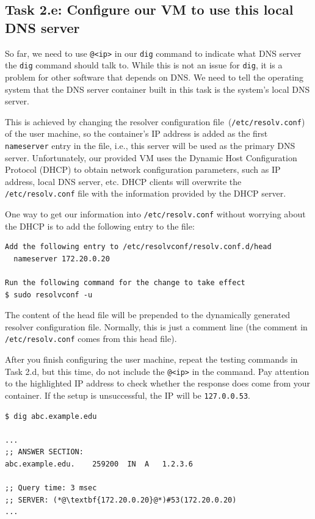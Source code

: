 \subsection{Task 2.e: Configure our VM to use this local DNS server} 

So far, we need to use \texttt{@<ip>} in our \texttt{dig} command
to indicate what DNS server the \texttt{dig} command should talk to. While this 
is not an issue for \texttt{dig}, it is a problem for other software that 
depends on DNS. We need to tell the operating system that the 
DNS server container built in this task is the system's 
local DNS server. 

This is achieved by changing
the resolver configuration file~(\texttt{/etc/resolv.conf}) of the user machine,
so the container's IP address is added as the first \texttt{nameserver} entry in the file, i.e.,
this server will be used as the primary DNS server.
Unfortunately, our provided VM uses the Dynamic Host Configuration Protocol (DHCP) to obtain
network configuration parameters, such as IP address, local DNS server, etc.
DHCP clients will overwrite the \texttt{/etc/resolv.conf} file with the information
provided by the DHCP server.

One way to get our information into \texttt{/etc/resolv.conf} without worrying about
the DHCP is to add the following entry to the 
file:

\begin{lstlisting}
Add the following entry to /etc/resolvconf/resolv.conf.d/head
  nameserver 172.20.0.20

Run the following command for the change to take effect
$ sudo resolvconf -u
\end{lstlisting}

The content of the head file will be prepended to the dynamically generated resolver
configuration file. Normally, this is just a comment line (the comment in
\texttt{/etc/resolv.conf} comes from this head file).


After you finish configuring the user machine, repeat 
the testing commands in Task 2.d, but this time, do not 
include the \texttt{@<ip>} in the command. Pay attention to 
the highlighted IP address to check whether the response does 
come from your container. If the setup is unsuccessful,
the IP will be \texttt{127.0.0.53}. 

\begin{lstlisting}
$ dig abc.example.edu

...
;; ANSWER SECTION:
abc.example.edu.	259200	IN	A	1.2.3.6

;; Query time: 3 msec
;; SERVER: (*@\textbf{172.20.0.20}@*)#53(172.20.0.20)
...
\end{lstlisting}
 




